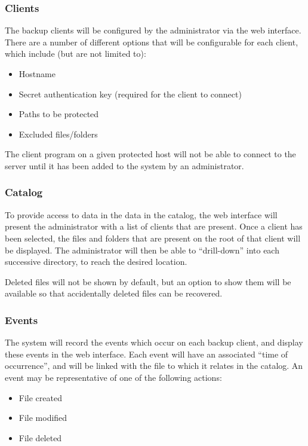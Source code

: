 \subsubsection{Clients}

The backup clients will be configured by the administrator via the web
interface. There are a number of different options that will be configurable
for each client, which include (but are not limited to):

\begin{itemize}
    \item Hostname
    \item Secret authentication key (required for the client to connect)
    \item Paths to be protected
    \item Excluded files/folders
\end{itemize}

The client program on a given protected host will not be able to connect to the
server until it has been added to the system by an administrator.

\subsubsection{Catalog}

To provide access to data in the data in the catalog, the web interface will
present the administrator with a list of clients that are present. Once
a client has been selected, the files and folders that are present on the root
of that client will be displayed. The administrator will then be able to
``drill-down'' into each successive directory, to reach the desired location.

Deleted files will not be shown by default, but an option to show them will be
available so that accidentally deleted files can be recovered.

\subsubsection{Events}

The system will record the events which occur on each backup client, and
display these events in the web interface. Each event will have an associated
``time of occurrence'', and will be linked with the file to which it relates in
the catalog. An event may be representative of one of the following actions:

\begin{itemize}
    \item File created
    \item File modified
    \item File deleted
\end{itemize}

